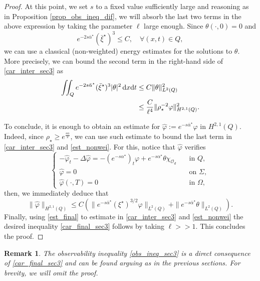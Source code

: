 \documentclass[preprint,10pt]{article}
\newtheorem{remark}[theorem]{Remark}
\numberwithin{equation}{section}
\numberwithin{theorem}{section}
\def\dx{\,\textnormal{d}x}
\def\dt{\textnormal{d}t}
\def\dx{\,\textnormal{d}x}
\def\dt{\textnormal{d}t}
\begin{document}
{\begin{proof}
At this point, we set $s$ to a fixed value sufficiently large and reasoning as in Proposition \ref{prop_obs_ineq_dif}, we will absorb the last two terms in the above expression by taking the parameter $\ell$ large enough. Since $\theta(\cdot,0)=0$ and
%
\begin{equation*}
e^{-2s\bar\alpha^\star}({\bar\xi^\star})^3\leq C, \quad \forall (x,t)\in Q,
\end{equation*}
% 
we can use a classical (non-weighted) energy estimates for the solutions to $\theta$. More precisely, we can bound the second term in the right-hand side of \eqref{car_inter_sec3} as
%
\begin{align}\notag
\iint_{Q}e^{-2s\bar\alpha^\star}({\bar\xi^\star})^3|\theta|^2\dx\dt&\leq C\|\theta\|^2_{L^2(Q)}  \\ \label{est_nonwei}
&\leq \frac{C}{\ell^4}\|\rho_\star^{-2}\varphi\|^2_{H^{2,1}(Q)}. 
\end{align}
%

To conclude, it is enough to obtain an estimate for $\widehat{\varphi}:=e^{-s\bar\alpha^\star}\varphi$ in $H^{2,1}(Q)$. Indeed, since $\rho_\star\geq e^{\frac{s\alpha}{2}}$, we can use such estimate to bound the last term in \eqref{car_inter_sec3} and \eqref{est_nonwei}. For this, notice that $\widehat{\varphi}$ verifies
%
\begin{equation*}%
\begin{cases}
-\widehat\varphi_t-\Delta \widehat\varphi=-(e^{-s\alpha^\star})_t\varphi+e^{-s\alpha^\star}\theta\chi_{\mathcal O_d} &\quad \text{in } Q, \\
\widehat\varphi=0 &\quad \text{on } \Sigma, \\
\widehat{\varphi}(\cdot,T)=0 &\quad\text{in } \Omega,
\end{cases}
\end{equation*}
%
then, we immediately deduce that
%
\begin{equation}\label{est_final}
\|\widehat{\varphi}\|_{H^{2,1}(Q)}\leq C\left(\|e^{-s\bar\alpha^\star}(\xi^\star)^{3/2}\varphi\|_{L^2(Q)}+\|e^{-s\bar\alpha^\star}\theta\|_{L^2(Q)}\right).
\end{equation}
%
Finally, using \eqref{est_final} to estimate in \eqref{car_inter_sec3} and \eqref{est_nonwei} the desired inequality \eqref{car_final_sec3} follows by taking $\ell>>1$. This concludes the proof.
%
\end{proof}

\begin{remark} The observability inequality \eqref{obs_ineq_sec3} is a direct consequence of \eqref{car_final_sec3} and can be found arguing as in the previous sections. For brevity, we will omit the proof. 
\end{remark}

}
\end{document}
